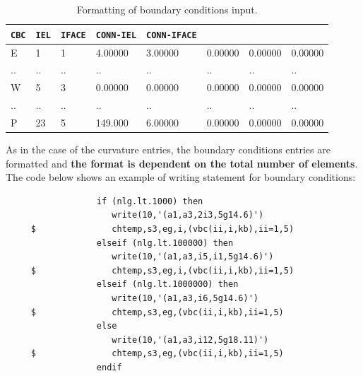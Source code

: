 \begin{description}
\footnotesize 
\begin{table}  
\begin{center}
\begin{tabular}{ l|l|l|l|l|l|l|l }
   \hline
 \texttt{CBC}& \texttt{IEL} &\texttt{IFACE} &\texttt{CONN-IEL}&\texttt{CONN-IFACE} &  &  & \\ \hline \hline
  E   & 1 & 1 &  4.00000   &    3.00000  &     0.00000      &     0.00000 &     0.00000 \\
   ..   & .. & .. &  ..   &   .. &    ..   &   .. &    ..   \\
   W  &  5 & 3 &  0.00000  &     0.00000  &     0.00000   &     0.00000 &     0.00000  \\
    ..   & .. & .. & ..   &   ..  &    ..   &   .. &    ..   \\
   P  &  23 & 5  & 149.000 &      6.00000  &     0.00000 &     0.00000 &     0.00000  \\
   \hline
\end{tabular} 
\caption{Formatting of boundary conditions input.}
\label{tab:bcs}  
\end{center}
\end{table}
\normalsize

As in the case of the curvature entries, the boundary conditions entries are formatted and {\bf the format is dependent on the total number of elements}.  
The code below shows an example of writing statement for boundary conditions:

\footnotesize
\begin{verbatim}
                  if (nlg.lt.1000) then
                     write(10,'(a1,a3,2i3,5g14.6)')
     $               chtemp,s3,eg,i,(vbc(ii,i,kb),ii=1,5)
                  elseif (nlg.lt.100000) then
                     write(10,'(a1,a3,i5,i1,5g14.6)')
     $               chtemp,s3,eg,i,(vbc(ii,i,kb),ii=1,5)
                  elseif (nlg.lt.1000000) then
                     write(10,'(a1,a3,i6,5g14.6)')
     $               chtemp,s3,eg,(vbc(ii,i,kb),ii=1,5)
                  else
                     write(10,'(a1,a3,i12,5g18.11)')
     $               chtemp,s3,eg,(vbc(ii,i,kb),ii=1,5)
                  endif
\end{verbatim}
\normalsize


\end{description}
